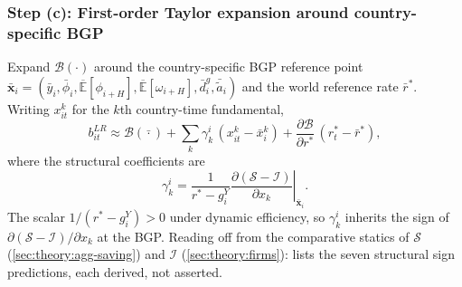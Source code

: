\subsubsection*{Step (c): First-order Taylor expansion around country-specific BGP}

Expand $\mathcal{B}(\cdot)$ around the country-specific BGP reference point
$\bar{\mathbf x}_i=(\bar y_i,\bar\phi_i,\overline{\mathbb{E}}[\phi_{i+H}],\overline{\mathbb{E}}[\omega_{i+H}],\bar d_i^g,\bar{\tilde a}_i)$
and the world reference rate $\bar r^*$. Writing $x_{it}^k$ for the $k$th
country-time fundamental,
\begin{equation}
b_{it}^{LR}\approx \mathcal{B}(\bar{\cdot})+\sum_k \gamma_k^i\,(x_{it}^k-\bar x_i^k)+\frac{\partial\mathcal{B}}{\partial r^*}\,(r_t^*-\bar r^*),
\label{eq:taylor}
\end{equation}
where the structural coefficients are
\begin{equation}
\gamma_k^i=\frac{1}{r^*-g_i^Y}\left.\frac{\partial(\mathcal{S}-\mathcal{I})}{\partial x_k}\right|_{\bar{\mathbf x}_i}.
\label{eq:gamma}
\end{equation}
The scalar $1/(r^*-g_i^Y)>0$ under dynamic efficiency, so $\gamma_k^i$ inherits
the sign of $\partial(\mathcal{S}-\mathcal{I})/\partial x_k$ at the BGP.
Reading off from the comparative statics of $\mathcal{S}$
(\cref{sec:theory:agg-saving}) and $\mathcal{I}$ (\cref{sec:theory:firms}):
 lists the seven structural sign predictions, each derived,
not asserted.

